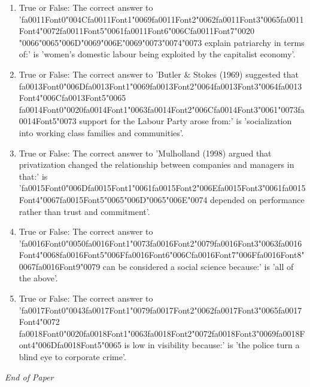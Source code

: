 \documentclass[12pt]{article}
\begin{document}
\begin{enumerate}[label=\arabic*.]
\item True or False: The correct answer to '{\csname fa0011Font0\endcsname\char"004C}{\csname fa0011Font1\endcsname\char"0069}{\csname fa0011Font2\endcsname\char"0062}{\csname fa0011Font3\endcsname\char"0065}{\csname fa0011Font4\endcsname\char"0072}{\csname fa0011Font5\endcsname\char"0061}{\csname fa0011Font6\endcsname\char"006C}{\csname fa0011Font7\endcsname\char"0020} {\char"0066}{\char"0065}{\char"006D}{\char"0069}{\char"006E}{\char"0069}{\char"0073}{\char"0074}{\char"0073} explain patriarchy in terms of:' is 'women's domestic labour being exploited by the capitalist economy'.
\item True or False: The correct answer to 'Butler \& Stokes (1969) suggested that {\csname fa0013Font0\endcsname\char"006D}{\csname fa0013Font1\endcsname\char"0069}{\csname fa0013Font2\endcsname\char"0064}{\csname fa0013Font3\endcsname\char"0064}{\csname fa0013Font4\endcsname\char"006C}{\csname fa0013Font5\endcsname\char"0065} {\csname fa0014Font0\endcsname\char"0020}{\csname fa0014Font1\endcsname\char"0063}{\csname fa0014Font2\endcsname\char"006C}{\csname fa0014Font3\endcsname\char"0061}{\char"0073}{\csname fa0014Font5\endcsname\char"0073} support for the Labour Party arose from:' is 'socialization into working class families and communities'.
\item True or False: The correct answer to 'Mulholland (1998) argued that privatization changed the relationship between companies and managers in that:' is '{\csname fa0015Font0\endcsname\char"006D}{\csname fa0015Font1\endcsname\char"0061}{\csname fa0015Font2\endcsname\char"006E}{\csname fa0015Font3\endcsname\char"0061}{\csname fa0015Font4\endcsname\char"0067}{\csname fa0015Font5\endcsname\char"0065}{\char"006D}{\char"0065}{\char"006E}{\char"0074} depended on performance rather than trust and commitment'.
\item True or False: The correct answer to '{\csname fa0016Font0\endcsname\char"0050}{\csname fa0016Font1\endcsname\char"0073}{\csname fa0016Font2\endcsname\char"0079}{\csname fa0016Font3\endcsname\char"0063}{\csname fa0016Font4\endcsname\char"0068}{\csname fa0016Font5\endcsname\char"006F}{\csname fa0016Font6\endcsname\char"006C}{\csname fa0016Font7\endcsname\char"006F}{\csname fa0016Font8\endcsname\char"0067}{\csname fa0016Font9\endcsname\char"0079} can be considered a social science because:' is 'all of the above'.
\item True or False: The correct answer to '{\csname fa0017Font0\endcsname\char"0043}{\csname fa0017Font1\endcsname\char"0079}{\csname fa0017Font2\endcsname\char"0062}{\csname fa0017Font3\endcsname\char"0065}{\csname fa0017Font4\endcsname\char"0072} {\csname fa0018Font0\endcsname\char"0020}{\csname fa0018Font1\endcsname\char"0063}{\csname fa0018Font2\endcsname\char"0072}{\csname fa0018Font3\endcsname\char"0069}{\csname fa0018Font4\endcsname\char"006D}{\csname fa0018Font5\endcsname\char"0065} is low in visibility because:' is 'the police turn a blind eye to corporate crime'.
\end{enumerate}

\vfill
\noindent\textit{End of Paper}
\end{document}
